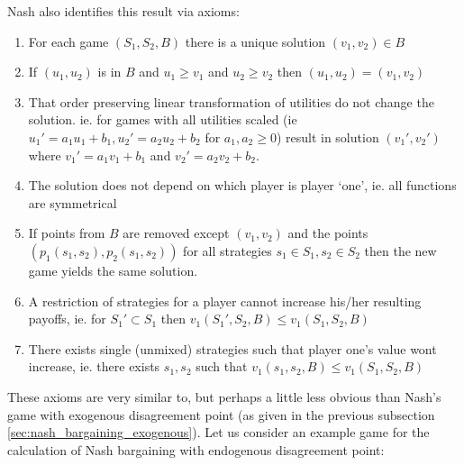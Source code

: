 Nash also identifies this result via axioms:
\begin{enumerate}
\item For each game $(S_1,S_2,B)$ there is a unique solution $(v_1,v_2) \in B$
\item If $(u_1,u_2)$ is in $B$ and $u_1\ge v_1$ and $u_2\ge v_2$ then $(u_1,u_2)=(v_1,v_2)$
\item That order preserving linear transformation of utilities do not change the solution. ie. for games with all utilities scaled (ie $u_1' = a_1u_1+b_1, u_2' = a_2u_2+b_2$ for $a_1,a_2\ge 0$) result in solution $(v_1',v_2')$ where $v_1'=a_1v_1+b_1$ and $v_2'=a_2v_2+b_2$.
\item The solution does not depend on which player is player `one', ie. all functions are symmetrical
\item If points from $B$ are removed except $(v_1,v_2)$ and the points $(p_1(s_1,s_2), p_2(s_1,s_2))$ for all strategies $s_1\in S_1,s_2\in S_2$ then the new game yields the same solution.
\item A restriction of strategies for a player cannot increase his/her resulting payoffs, ie. for $S_1'\subset S_1$ then $v_1(S_1',S_2,B)\le v_1(S_1,S_2,B)$
\item There exists single (unmixed) strategies such that player one's value wont increase, ie. there exists $s_1,s_2$ such that $v_1(s_1,s_2,B)\le v_1(S_1,S_2,B)$
\end{enumerate}

These axioms are very similar to, but perhaps a little less obvious than Nash's game with exogenous disagreement point (as given in the previous subsection \ref{sec:nash_bargaining_exogenous}).
Let us consider an example game for the calculation of Nash bargaining with endogenous disagreement point:

